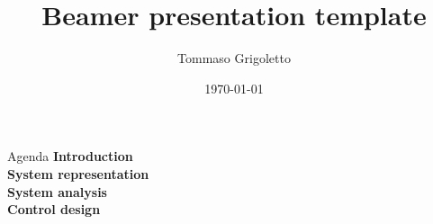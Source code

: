 \documentclass[11pt,aspectratio=169,t]{beamer}
\begin{document}
\title{Beamer presentation template}

\author{Tommaso Grigoletto}

\date{\today}
\frame[noframenumbering]{\titlepage}


\begin{frame}{Agenda}
	\vfill
	\centering
	    \textbf{\color{c1}  Introduction}\\ \bigskip
		\textbf{\color{c2}  System representation}\\ \bigskip
		\textbf{\color{c3}  System analysis}\\ \bigskip
		\textbf{\color{c4}  Control design}\\ \bigskip
	\vfill
\end{frame}
\end{document}
